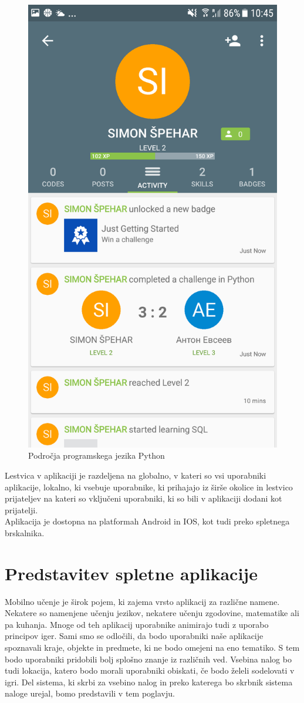 \documentclass[a4paper, 12pt]{book}
\begin{document}
\begin{figure}[H]
\centering
\includegraphics[height=0.7\textwidth]{slike/SoloLearn_person}
\caption{Področja programskega jezika Python}\label{sololearn}
\end{figure}
\noindent Lestvica v aplikaciji je razdeljena na globalno, v kateri so vsi uporabniki aplikacije, lokalno, ki vsebuje uporabnike, ki prihajajo iz širše okolice in lestvico prijateljev na kateri so vključeni uporabniki, ki so bili v aplikaciji dodani kot prijatelji.\\Aplikacija je dostopna na platformah Android in IOS, kot tudi preko spletnega brskalnika.
\chapter{Predstavitev spletne aplikacije}
Mobilno učenje je širok pojem, ki zajema vrsto aplikacij za različne namene. Nekatere so namenjene učenju jezikov, nekatere učenju zgodovine, matematike ali pa kuhanja. Mnoge od teh aplikacij uporabnike animirajo tudi z uporabo principov iger. Sami smo se odločili, da bodo uporabniki naše aplikacije spoznavali kraje, objekte in predmete, ki ne bodo omejeni na eno tematiko. S tem bodo uporabniki pridobili bolj splošno znanje iz različnih ved. Vsebina nalog bo tudi lokacija, katero bodo morali uporabniki obiskati, če bodo želeli sodelovati v igri. Del sistema, ki skrbi za vsebino nalog in preko katerega bo skrbnik sistema naloge urejal, bomo predstavili v tem poglavju.
\end{document}
